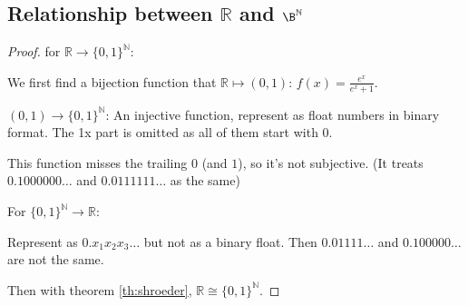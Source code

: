 \subsection{Relationship between \texorpdfstring{\(\mathbb{R}\) and
\(\B^\mathbb{N}\)}{R, and B\^N}}
\begin{corollary}
\end{corollary}

\begin{proof}
for $\mathbb{R} \rightarrow \{0,1\}^{\mathbb{N}}$:

We first find a bijection function that
\(\mathbb{R} \mapsto (0,1)\): \(f(x) = \frac{e^x}{e^x+1}\).

\((0,1) \rightarrow \{0,1\}^\mathbb{N}\): An injective function,
represent as float numbers in binary format. The 1x part is omitted as
all of them start with 0.

This function misses the trailing \(0\) (and \(1\)), so it's not
subjective. (It treats \(0.1000000\dots\) and \(0.0111111\dots\) as the
same)

For \(\{0,1\}^\mathbb{N} \rightarrow \mathbb{R}\): 

Represent as
\(0.x_1x_2x_3\dots\) but not as a binary float. Then \(0.01111\dots\)
and \(0.100000\dots\) are not the same.

Then with theorem \ref{th:shroeder}, \(\mathbb{R} \cong \{0,1\}^\mathbb{N}\).
\end{proof}
